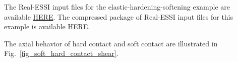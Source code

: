 The Real-ESSI input files for the elastic-hardening-softening example are available 
\href{http://sokocalo.engr.ucdavis.edu/~jeremic/lecture_notes_online_material/_Chapter_Short_Course_Examples/short-course-examples/Day3/Contact_Examples/shear/SoftContact_Nonlinear_Hardening_Softening_Shear_Model}{HERE}. 
The compressed package of Real-ESSI input files for this example is available 
\href{http://sokocalo.engr.ucdavis.edu/~jeremic/lecture_notes_online_material/_Chapter_Short_Course_Examples/short-course-examples/Day3/Contact_Examples/shear/SoftContact_Nonlinear_Hardening_Softening_Shear_Model/_all_files_packaged_for_SoftContact_Nonlinear_Hardening_Softening_Shear_Model.tar.gz}{HERE}. 



The axial behavior of hard contact and soft contact are illustrated in Fig.~\ref{fig_soft_hard_contact_shear}.


